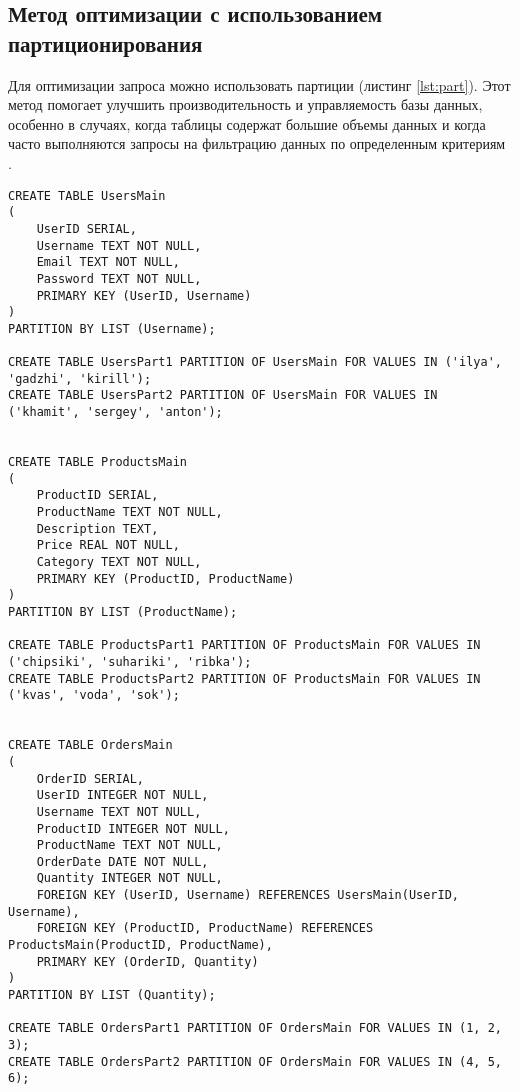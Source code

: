 \documentclass{bmstu}
\begin{document}
\subsection*{Метод оптимизации с использованием партиционирования}
Для оптимизации запроса можно использовать партиции (листинг \ref{lst:part}).
Этот метод помогает улучшить производительность и управляемость базы данных, особенно в случаях, 
когда таблицы содержат большие объемы данных и когда часто выполняются запросы на фильтрацию 
данных по определенным критериям \cite{ninthOptSQL}.
\begin{lstlisting}[caption={Переопределение базы и создание партиций}, label=lst:part]
CREATE TABLE UsersMain
(
    UserID SERIAL,
    Username TEXT NOT NULL,
    Email TEXT NOT NULL,
    Password TEXT NOT NULL,
    PRIMARY KEY (UserID, Username)
)
PARTITION BY LIST (Username);

CREATE TABLE UsersPart1 PARTITION OF UsersMain FOR VALUES IN ('ilya', 'gadzhi', 'kirill');
CREATE TABLE UsersPart2 PARTITION OF UsersMain FOR VALUES IN ('khamit', 'sergey', 'anton');


CREATE TABLE ProductsMain
(
    ProductID SERIAL,
    ProductName TEXT NOT NULL,
    Description TEXT,
    Price REAL NOT NULL,
    Category TEXT NOT NULL,
    PRIMARY KEY (ProductID, ProductName)
)
PARTITION BY LIST (ProductName);

CREATE TABLE ProductsPart1 PARTITION OF ProductsMain FOR VALUES IN ('chipsiki', 'suhariki', 'ribka');
CREATE TABLE ProductsPart2 PARTITION OF ProductsMain FOR VALUES IN ('kvas', 'voda', 'sok');


CREATE TABLE OrdersMain
(
    OrderID SERIAL,
    UserID INTEGER NOT NULL,
    Username TEXT NOT NULL,
    ProductID INTEGER NOT NULL,
    ProductName TEXT NOT NULL,
    OrderDate DATE NOT NULL,
    Quantity INTEGER NOT NULL,
    FOREIGN KEY (UserID, Username) REFERENCES UsersMain(UserID, Username),
    FOREIGN KEY (ProductID, ProductName) REFERENCES ProductsMain(ProductID, ProductName),
    PRIMARY KEY (OrderID, Quantity)
)
PARTITION BY LIST (Quantity);

CREATE TABLE OrdersPart1 PARTITION OF OrdersMain FOR VALUES IN (1, 2, 3);
CREATE TABLE OrdersPart2 PARTITION OF OrdersMain FOR VALUES IN (4, 5, 6);
\end{lstlisting}

\end{document}
